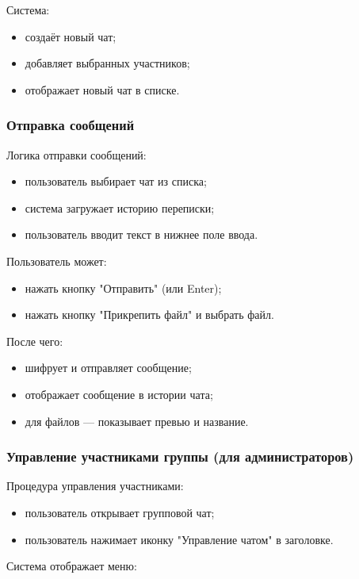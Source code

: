 Система:

\begin{itemize}		
\item создаёт новый чат;  
\item добавляет выбранных участников;  
\item отображает новый чат в списке.  
\end{itemize} 

\subsubsection{Отправка сообщений}  
Логика отправки сообщений:  
\begin{itemize}  
	\item пользователь выбирает чат из списка;  
	\item система загружает историю переписки;  
	\item пользователь вводит текст в нижнее поле ввода.
\end{itemize}

Пользователь может:

\begin{itemize}
		\item нажать кнопку "Отправить" (или Enter);  
		\item нажать кнопку "Прикрепить файл" и выбрать файл.
\end{itemize}

После чего:

\begin{itemize}
		\item шифрует и отправляет сообщение;  
		\item отображает сообщение в истории чата;  
		\item для файлов — показывает превью и название.   
\end{itemize}  

\subsubsection{Управление участниками группы (для администраторов)}  
Процедура управления участниками:  
\begin{itemize}  
	\item пользователь открывает групповой чат;  
	\item пользователь нажимает иконку "Управление чатом" в заголовке.  
\end{itemize}

Система отображает меню:

